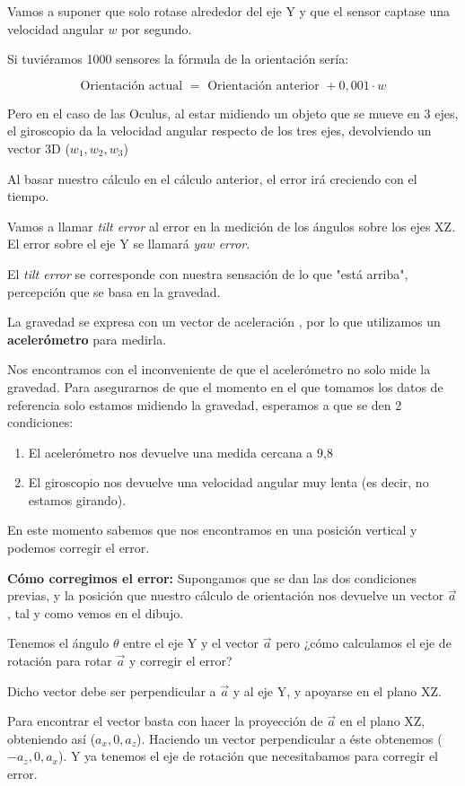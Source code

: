 \documentclass[twoside, 12pt]{epstfg}
\begin{document}
Vamos a suponer que solo rotase alrededor del eje Y y que el sensor captase una velocidad angular $w$ por segundo.

Si tuviéramos 1000 sensores la fórmula de la orientación sería:

$$\text{Orientación actual } = \text{ Orientación anterior } + 0,001 \cdot w$$

Pero en el caso de las Oculus, al estar midiendo un objeto que se mueve en 3 ejes, el giroscopio da la velocidad angular respecto de los tres ejes, devolviendo un vector 3D ($w_1,w_2,w_3$)

Al basar nuestro cálculo en el cálculo anterior, el error irá creciendo con el tiempo.

Vamos a llamar \textit{tilt error} al error en la medición de los ángulos sobre los ejes XZ. El error sobre el eje Y se llamará \textit{yaw error}.

El \textit{tilt error} se corresponde con nuestra sensación de lo que "está arriba", percepción que se basa en la gravedad.

La gravedad se expresa con un vector de aceleración , por lo que utilizamos un \textbf{acelerómetro} para medirla.

Nos encontramos con el inconveniente de que el acelerómetro no solo mide la gravedad. Para asegurarnos de que el momento en el que tomamos los datos de referencia solo estamos midiendo la gravedad, esperamos a que se den 2 condiciones:
\begin{enumerate}
	\item El acelerómetro nos devuelve una medida cercana a 9,8
	\item El giroscopio nos devuelve una velocidad angular muy lenta (es decir, no estamos girando).
\end{enumerate}

En este momento sabemos que nos encontramos en una posición vertical y podemos corregir el error.

\textbf{Cómo corregimos el error:}
Supongamos que se dan las dos condiciones previas, y la posición que nuestro cálculo de orientación nos devuelve un vector $\vec{a}$, tal y como vemos en el dibujo.

Tenemos el ángulo $\theta$ entre el eje Y y el vector $\vec{a}$ pero ¿cómo calculamos el eje de rotación para rotar $\vec{a}$ y corregir el error?

Dicho vector debe ser perpendicular a $\vec{a}$ y al eje Y, y apoyarse en el plano XZ.

Para encontrar el vector basta con hacer la proyección de $\vec{a}$ en el plano XZ, obteniendo así ($a_x, 0 , a_z$). Haciendo un vector perpendicular a éste obtenemos ($-a_z, 0 , a_x$). Y ya tenemos el eje de rotación que necesitabamos para corregir el error.
\end{document}
